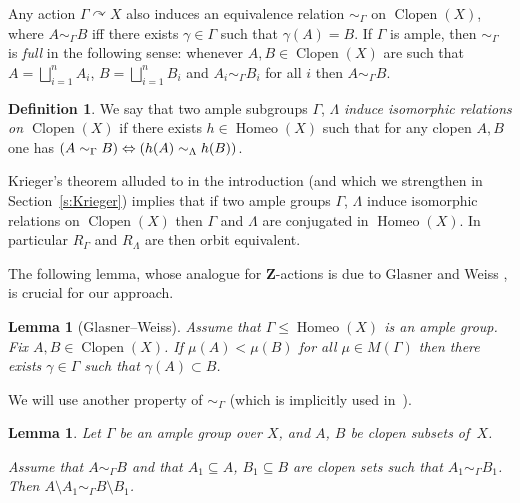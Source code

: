 \documentclass[10pt,a4paper]{article}
\newtheorem{lemm}[theo]{Lemma}
\theoremstyle{definition}
\newtheorem{defi}[theo]{Definition}
\DeclareMathOperator{\Homeo}{Homeo}
\DeclareMathOperator{\Clopen}{Clopen}
\newcommand{\actson}{\curvearrowright}
\newcommand{\Z}{\mathbf{Z}}
\let\oldLeftrightarrow\Leftrightarrow
\renewcommand*{\Leftrightarrow}{\mathchoice{\Longleftrightarrow}{\oldLeftrightarrow}{\oldLeftrightarrow}{\oldLeftrightarrow}}
\begin{document}
Any action $\Gamma \actson X$ also induces an equivalence relation $\sim_\Gamma$ on $\Clopen(X)$, where $A \sim_\Gamma B$ iff there exists $\gamma \in \Gamma$ such that $\gamma(A)=B$. If $\Gamma$ is ample, then $\sim_\Gamma$ is \emph{full} in the following sense: whenever $A, B \in \Clopen(X)$ are such that $A= \bigsqcup_{i=1}^n A_i$, $B=\bigsqcup_{i=1}^n B_i$ and $A_i \sim_\Gamma B_i$ for all $i$ then $A \sim_\Gamma B$.


\begin{defi}
We say that two ample subgroups $\Gamma$, $\Lambda$ \emph{induce isomorphic relations on $\Clopen(X)$} if there exists $h \in \Homeo(X)$ such that for any clopen $A,B$ one has $(A \sim_\Gamma B) \Leftrightarrow (h(A) \sim_\Lambda h(B))$.
\end{defi}

Krieger's theorem alluded to in the introduction (and which we strengthen in Section~\ref{s:Krieger}) implies that if two ample groups $\Gamma$, $\Lambda$ induce isomorphic relations on $\Clopen(X)$ then $\Gamma$ and $\Lambda$ are conjugated in $\Homeo(X)$. In particular $R_\Gamma$ and $R_\Lambda$ are then orbit equivalent.


The following lemma, whose analogue for $\Z$-actions is due to Glasner and Weiss \cite{Glasner1995a}, is crucial for our approach.


\begin{lemm}[Glasner--Weiss]\label{l:Glasner_Weiss}
Assume that $\Gamma \le \Homeo(X)$ is an ample group. Fix $A,B \in \Clopen(X)$. If $\mu(A) < \mu(B)$ for all $\mu \in M(\Gamma)$ then there exists $\gamma \in \Gamma$ such that $\gamma(A)\subset B$.
\end{lemm}



We will use another property of $\sim_\Gamma$ (which is implicitly used in~\cite{Melleray2023}).

\begin{lemm}\label{l:equidecomposability_on_clopens_is_induced_by_full_group}
Let $\Gamma$ be an ample group over $X$, and $A$, $B$ be clopen subsets of~$X$.

Assume that $A \sim_\Gamma B$ and that $A_1 \subseteq A$, $B_1 \subseteq B$ are clopen sets such that $A_1 \sim_\Gamma B_1$. Then $A \setminus A_1 \sim_\Gamma B \setminus B_1$.
\end{lemm}
\end{document}
